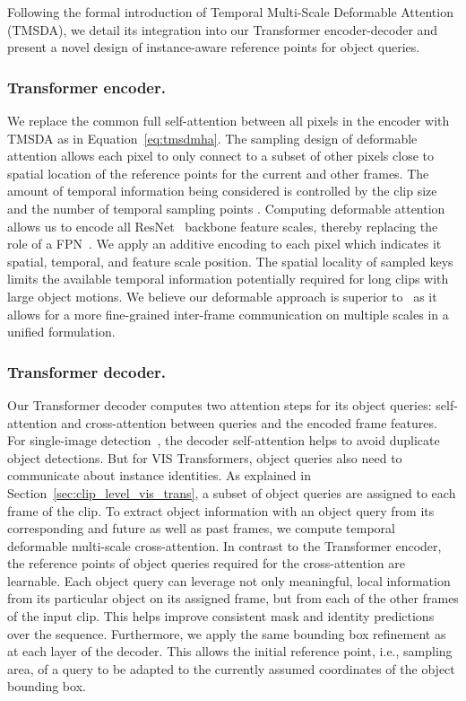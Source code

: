 \documentclass[runningheads]{llncs}
\newcommand{\ie}{i.e.}
\begin{document}
Following the formal introduction of Temporal Multi-Scale Deformable Attention (TMSDA), we detail its integration into our Transformer encoder-decoder and present a novel design of instance-aware reference points for object queries.

\subsubsection{Transformer encoder.}
We replace the common full self-attention between all pixels in the encoder with TMSDA as in Equation~\ref{eq:tmsdmha}. 
The sampling design of deformable attention allows each pixel to only connect to a subset of other pixels close to spatial location of the reference points  for the current and other frames. 
The amount of temporal information being considered is controlled by the clip size  and the number of temporal sampling points .
Computing deformable attention allows us to encode all  ResNet~\cite{resnet} backbone feature scales, thereby replacing the role of a FPN~\cite{FPN}.
We apply an additive encoding to each pixel which indicates it spatial, temporal, and feature scale position.
The spatial locality of sampled keys limits the available temporal information potentially required for long clips with large object motions.
We believe our deformable approach is superior to~\cite{vistr,IFC} as it allows for a more fine-grained inter-frame communication on multiple scales in a unified formulation.




\subsubsection{Transformer decoder.}
Our Transformer decoder computes two attention steps for its object queries: self-attention and cross-attention between queries and the encoded frame features. 
For single-image detection~\cite{DETR}, the decoder self-attention helps to avoid duplicate object detections.
But for VIS Transformers, object queries also need to communicate about instance identities.
As explained in Section~\ref{sec:clip_level_vis_trans}, a subset of object queries are assigned to each frame of the clip.
To extract object information with an object query from its corresponding and future as well as past frames, we compute temporal deformable multi-scale cross-attention.
In contrast to the Transformer encoder, the reference points of object queries required for the cross-attention are learnable.
Each object query can leverage not only meaningful, local information from its particular object on its assigned frame, but from each of the other frames of the input clip.   
This helps improve consistent mask and identity predictions over the sequence.
Furthermore, we apply the same bounding box refinement as~\cite{deformable_detr} at each layer of the decoder.
This allows the initial reference point, \ie, sampling area, of a query to be adapted to the currently assumed coordinates of the object bounding box.
\end{document}
